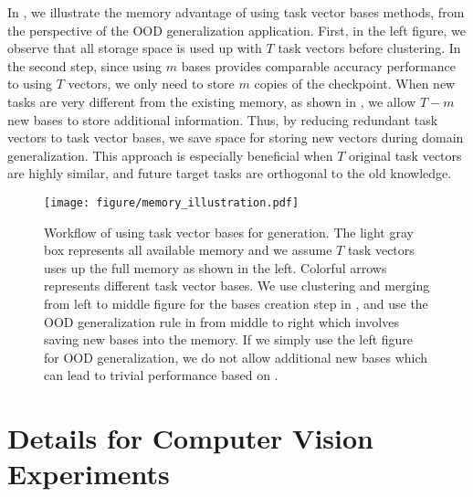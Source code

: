 In , we illustrate the memory advantage of using task vector bases methods, from the perspective of the OOD generalization application. First, in the left figure, we observe that all storage space is used up with $T$ task vectors before clustering. In the second step, since using $m$ bases provides comparable accuracy performance to using $T$ vectors, we only need to store $m$ copies of the checkpoint. When new tasks are very different from the existing memory, as shown in , we allow $T - m$ new bases to store additional information. Thus, by reducing redundant task vectors to task vector bases, we save space for storing new vectors during domain generalization. This approach is especially beneficial when $T$ original task vectors are highly similar, and future target tasks are orthogonal to the old knowledge.

\begin{figure}[!ht]
    \centering
\texttt{[image: figure/memory\_illustration.pdf]}
    \caption{Workflow of using task vector bases for generation. The light gray box represents all available memory and we assume $T$ task vectors uses up the full memory as shown in the left. Colorful arrows represents different task vector bases. We use clustering and merging from left to middle figure for the bases creation step in , and use the OOD generalization rule in  from middle to right which involves saving new bases into the memory. If we simply use the left figure for OOD generalization, we do not allow additional new bases which can lead to trivial performance based on .}
    \label{fig:memo_comparison}
\end{figure}



\section{Details for Computer Vision Experiments}
\label{sec:cv_details}
